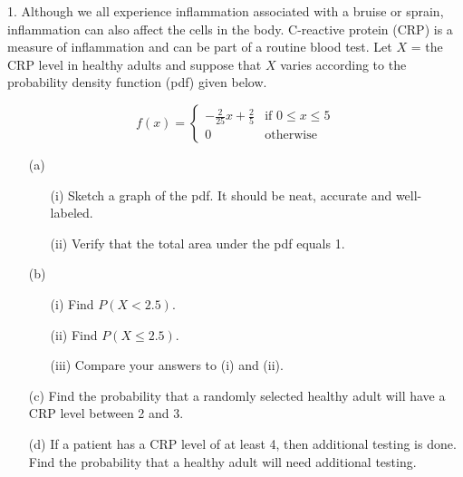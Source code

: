 \documentclass{report}
\begin{document}
 \begin{mdframed}
     1. Although we all experience inflammation associated with a bruise or sprain, inflammation can also affect the cells in the body. C-reactive protein (CRP) is a measure of inflammation and can be part of a routine blood test. Let $X$ = the CRP level in healthy adults and suppose that $X$ varies according to the probability density function (pdf) given below.

     \[
         f(x) = 
         \begin{cases} 
             -\frac{2}{25}x + \frac{2}{5} & \text{if } 0 \leq x \leq 5 \\ 
             0 & \text{otherwise} 
         \end{cases}
     \]

     \begin{enumerate}
         \item[(a)] 
             \begin{enumerate}
                 \item[(i)] Sketch a graph of the pdf. It should be neat, accurate and well-labeled.
                 \item[(ii)] Verify that the total area under the pdf equals 1.
             \end{enumerate}
         \item[(b)] 
             \begin{enumerate}
                 \item[(i)] Find $P(X < 2.5)$.
                 \item[(ii)] Find $P(X \leq 2.5)$.
                 \item[(iii)] Compare your answers to (i) and (ii).
             \end{enumerate}
         \item[(c)] Find the probability that a randomly selected healthy adult will have a CRP level between 2 and 3.
         \item[(d)] If a patient has a CRP level of at least 4, then additional testing is done. Find the probability that a healthy adult will need additional testing.
     \end{enumerate}
 \end{mdframed}
 \bigbreak \noindent 
\end{document}

